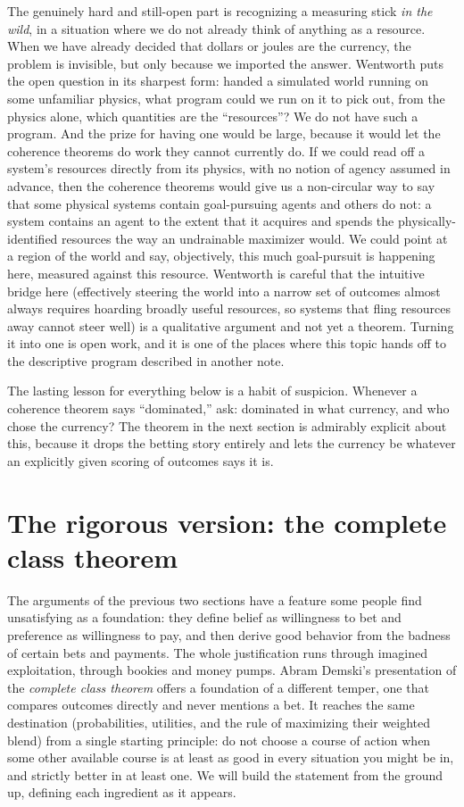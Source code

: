 \documentclass[10pt]{article}
\theoremstyle{definition}
\theoremstyle{remark}
\begin{document}
The genuinely hard and still-open part is recognizing a measuring stick \emph{in the wild}, in a situation where we do not already think of anything as a resource. When we have already decided that dollars or joules are the currency, the problem is invisible, but only because we imported the answer. Wentworth puts the open question in its sharpest form: handed a simulated world running on some unfamiliar physics, what program could we run on it to pick out, from the physics alone, which quantities are the ``resources''? We do not have such a program. And the prize for having one would be large, because it would let the coherence theorems do work they cannot currently do. If we could read off a system's resources directly from its physics, with no notion of agency assumed in advance, then the coherence theorems would give us a non-circular way to say that some physical systems contain goal-pursuing agents and others do not: a system contains an agent to the extent that it acquires and spends the physically-identified resources the way an undrainable maximizer would. We could point at a region of the world and say, objectively, this much goal-pursuit is happening here, measured against this resource. Wentworth is careful that the intuitive bridge here (effectively steering the world into a narrow set of outcomes almost always requires hoarding broadly useful resources, so systems that fling resources away cannot steer well) is a qualitative argument and not yet a theorem. Turning it into one is open work, and it is one of the places where this topic hands off to the descriptive program described in another note.

The lasting lesson for everything below is a habit of suspicion. Whenever a coherence theorem says ``dominated,'' ask: dominated in what currency, and who chose the currency? The theorem in the next section is admirably explicit about this, because it drops the betting story entirely and lets the currency be whatever an explicitly given scoring of outcomes says it is.

\section{The rigorous version: the complete class theorem}
\label{sec:completeclass}

The arguments of the previous two sections have a feature some people find unsatisfying as a foundation: they define belief as willingness to bet and preference as willingness to pay, and then derive good behavior from the badness of certain bets and payments. The whole justification runs through imagined exploitation, through bookies and money pumps. Abram Demski's presentation of the \emph{complete class theorem} offers a foundation of a different temper, one that compares outcomes directly and never mentions a bet. It reaches the same destination (probabilities, utilities, and the rule of maximizing their weighted blend) from a single starting principle: do not choose a course of action when some other available course is at least as good in every situation you might be in, and strictly better in at least one. We will build the statement from the ground up, defining each ingredient as it appears.
\end{document}
